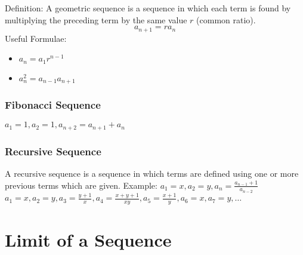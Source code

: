 \documentclass{article}
\begin{document}
Definition:
A geometric sequence is a sequence in which each term is found by multiplying the preceding term by the same value $r$ (common ratio).
$$a_{n+1}=r a_{n}$$
Useful Formulae:
\begin{itemize}
    \item $a_{n}=a_1r^{n-1}$
    \item $a_{n}^2=a_{n-1}a_{n+1}$
\end{itemize}

\subsubsection{Fibonacci Sequence}
$a_1=1, a_2=1, a_{n+2}=a_{n+1}+a_{n} $
\subsubsection{Recursive Sequence}
A recursive sequence is a sequence in which terms are defined using one or more previous terms which are given.
Example:
$a_1=x,a_2=y, a_n=\frac{a_{n-1}+1}{a_{n-2}}$
\\
$a_1=x,a_2=y,a_3=\frac{y+1}{x}, a_4=\frac{x+y+1}{xy}, a_5 = \frac{x+1}{y}, a_6=x, a_7=y, \dots$

\section{Limit of a Sequence}
\end{document}
